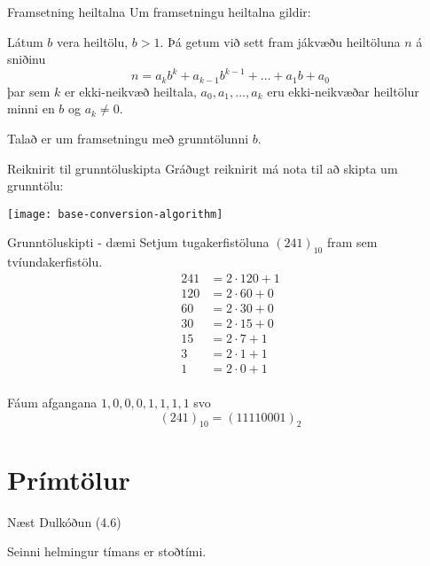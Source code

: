 \documentclass[handout]{beamer}
\begin{document}
\begin{frame}{Framsetning heiltalna}
Um framsetningu heiltalna gildir:

\begin{tcolorbox}[title=Framsetning heiltalna]
Látum $b$ vera heiltölu, $b > 1$. Þá getum við sett fram jákvæðu heiltöluna $n$ á sniðinu
\[
 n = a_kb^k + a_{k-1}b^{k-1} + \ldots + a_1b + a_0
\]
þar sem $k$ er ekki-neikvæð heiltala, $a_0, a_1, \ldots, a_k$ eru ekki-neikvæðar heiltölur minni en $b$ og $a_k \neq 0$.
\end{tcolorbox}
Talað er um framsetningu með grunntölunni $b$.
\end{frame}

\begin{frame}{Reiknirit til grunntöluskipta}
Gráðugt reiknirit má nota til að skipta um grunntölu:
\begin{center}
\texttt{[image: base-conversion-algorithm]}
\end{center}
\end{frame}

\begin{frame}{Grunntöluskipti - dæmi}
\vspace{0.5cm}
Setjum tugakerfistöluna $(241)_{10}$ fram sem tvíundakerfistölu.
\begin{align*}
241 &= 2 \cdot 120 + 1\\
120 &= 2 \cdot 60 + 0\\
60 &= 2 \cdot 30 + 0\\
30 &= 2 \cdot 15 + 0\\
15 &= 2 \cdot 7 + 1\\
3 &= 2 \cdot 1 + 1\\
1&= 2 \cdot 0 + 1\\
\end{align*}

\vspace{-0.8cm}
Fáum afgangana $1, 0, 0, 0, 1, 1, 1, 1$ svo
\[
 (241)_{10} = (11110001)_2
\]

\end{frame}


\section{Prímtölur}

\begin{frame}{Næst}
Dulkóðun (4.6)

Seinni helmingur tímans er stoðtími.
\end{frame}
\end{document}
